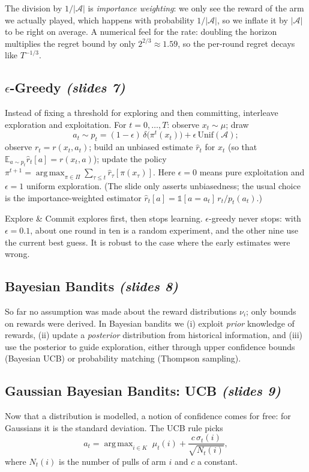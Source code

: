\documentclass[11pt,a4paper]{article}
\newcommand{\E}{\mathbb{E}}
\DeclareMathOperator*{\argmax}{arg\,max}
\newcommand{\slr}[1]{\texorpdfstring{\emph{(slides #1)}}{(slides #1)}}
\newcommand{\cA}{\mathcal{A}}
\theoremstyle{plain}
\theoremstyle{definition}
\theoremstyle{remark}
\begin{document}
\begin{intuition}
The division by $1/|\cA|$ is \emph{importance weighting}: we only see the reward of the arm we actually played, which happens with probability $1/|\cA|$, so we inflate it by $|\cA|$ to be right on average. A numerical feel for the rate: doubling the horizon multiplies the regret bound by only $2^{2/3}\approx1.59$, so the per-round regret decays like $T^{-1/3}$.
\end{intuition}

\subsection{\texorpdfstring{$\epsilon$}{epsilon}-Greedy \slr{7}}
Instead of fixing a threshold for exploring and then committing, interleave exploration and exploitation. For $t=0,\dots,T$: observe $x_t\sim\mu$; draw
\[
  a_t\sim p_t=(1-\epsilon)\,\delta\big(\pi^t(x_t)\big)+\epsilon\,\mathrm{Unif}(\cA);
\]
observe $r_t=r(x_t,a_t)$; build an unbiased estimate $\hat r_t$ for $x_t$ (so that $\E_{a\sim p_t}\hat r_t[a]=r(x_t,a)$); update the policy $\pi^{t+1}=\argmax_{\pi\in\Pi}\sum_{\tau\le t}\hat r_\tau[\pi(x_\tau)]$. Here $\epsilon=0$ means pure exploitation and $\epsilon=1$ uniform exploration. (The slide only asserts unbiasedness; the usual choice is the importance-weighted estimator $\hat r_t[a]=\mathbb 1[a=a_t]\,r_t/p_t(a_t)$.)

\begin{intuition}
Explore \& Commit explores first, then stops learning. $\epsilon$-greedy never stops: with $\epsilon=0.1$, about one round in ten is a random experiment, and the other nine use the current best guess. It is robust to the case where the early estimates were wrong.
\end{intuition}

\subsection{Bayesian Bandits \slr{8}}
So far no assumption was made about the reward distributions $\nu_i$; only bounds on rewards were derived. In Bayesian bandits we (i) exploit \emph{prior} knowledge of rewards, (ii) update a \emph{posterior} distribution from historical information, and (iii) use the posterior to guide exploration, either through upper confidence bounds (Bayesian UCB) or probability matching (Thompson sampling).

\subsection{Gaussian Bayesian Bandits: UCB \slr{9}}
Now that a distribution is modelled, a notion of confidence comes for free: for Gaussians it is the standard deviation. The UCB rule picks
\[
  a_t=\argmax_{i\in K}\;\mu_t(i)+\frac{c\,\sigma_t(i)}{\sqrt{N_t(i)}},
\]
where $N_t(i)$ is the number of pulls of arm $i$ and $c$ a constant.
\end{document}
